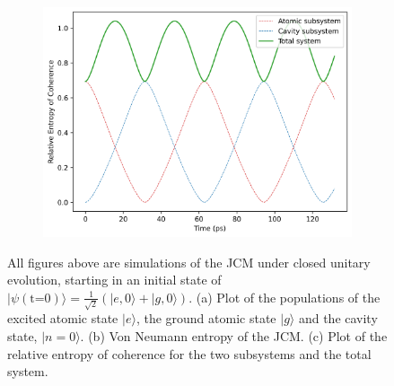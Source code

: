 \documentclass[12pt]{article}
\begin{document}
\begin{figure}[h]
    \begin{subfigure}{0.45\textwidth}
        \centering
        \includegraphics[width=\linewidth]{Research Project/Code/results/JCM/CQS_coh_eg.png}
        \caption{}
        \label{fig:jcm_cqs_coh_eg}
    \end{subfigure}
    \hfill

    \caption{All figures above are simulations of the JCM under closed unitary evolution, starting in an initial state of $|\psi (\text{t=0})\rangle = \frac{1}{\sqrt{2}}(|e, 0\rangle + |g,0\rangle)$. (a) Plot of the populations of the excited atomic state $|e\rangle$, the ground atomic state $|g\rangle$ and the cavity state, $|n=0\rangle$. (b) Von Neumann entropy of the JCM. (c) Plot of the relative entropy of coherence for the two subsystems and the total system.}
    \label{fig:JCM_cqs_e0g0}
\end{figure}
\end{document}
